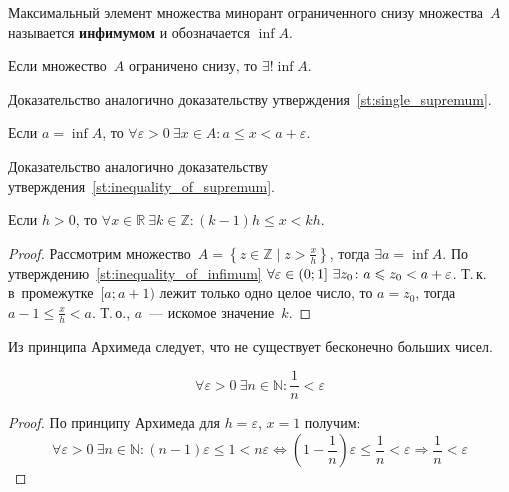  Максимальный элемент множества минорант ограниченного снизу множества~$A$ называется \textbf{инфимумом} и обозначается $\inf A$.

\begin{statement}
Если множество~$A$ ограничено снизу, то $\exists! \inf A$.
\end{statement}%
Доказательство аналогично доказательству утверждения~\ref*{st:single_supremum}.

\begin{statement}
\label{st:inequality_of_infimum}
Если $a = \inf A$, то $\forall \varepsilon > 0 \ \exists x \in A \colon a \leqslant x < a + \varepsilon$.
\end{statement}%
Доказательство аналогично доказательству утверждения~\ref*{st:inequality_of_supremum}.

\begin{theorem}
Если $h > 0$, то
$\forall x \in \mathbb R \ \exists k \in \mathbb Z \colon (k - 1)h \leqslant x < kh$.
\end{theorem}
\begin{proof}
Рассмотрим множество~$A = \left\{ z \in \mathbb Z \mid z > \frac{x}h \right\}$, тогда $\exists a = \inf A$.
По утверждению~\ref*{st:inequality_of_infimum}
$\forall \varepsilon \in \nobreak (0; 1] \ \exists z_0 \colon a \leqslant z_0 < a + \varepsilon$.
Т.\,к. в~промежутке~$[a; a + 1)$ лежит только одно целое число, то $a = z_0$, тогда $a - 1 \leqslant \frac{x}h < a$.
Т.\,о., $a$~--- искомое значение~$k$.
\end{proof}

Из принципа Архимеда следует, что не существует бесконечно больших чисел.

\begin{consequent}
\label{conseq:small_rational_exists}
\begin{equation*}
\forall \varepsilon > 0 \ \exists n \in \mathbb N \colon \frac1n < \varepsilon
\end{equation*}
\end{consequent}
\begin{proof}
По принципу Архимеда для $h = \varepsilon$, $x = 1$ получим:
\begin{equation*}
\forall \varepsilon > 0 \ \exists n \in \mathbb N \colon
(n - 1)\varepsilon \leqslant 1 < n\varepsilon \Leftrightarrow
(1 - \frac1n)\varepsilon \leqslant \frac1n < \varepsilon \Rightarrow
\frac1n < \varepsilon
\end{equation*}
\end{proof}

